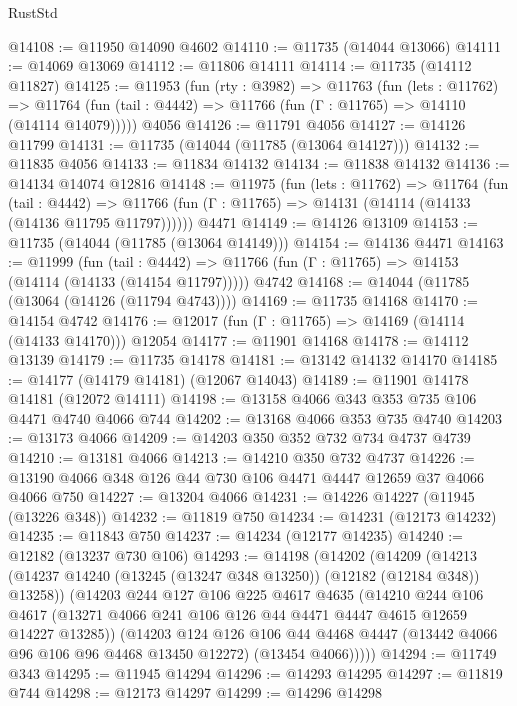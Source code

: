 \begin{lexlean}{RustStd}
\begin{coremodule}
@14108 := @11950 @14090 @4602
@14110 := @11735 (@14044 @13066)
@14111 := @14069 @13069
@14112 := @11806 @14111
@14114 := @11735 (@14112 @11827)
@14125 := @11953
    (fun (rty : @3982) =>
    @11763
      (fun (lets : @11762) =>
      @11764 (fun (tail : @4442) => @11766 (fun (Γ : @11765) => @14110 (@14114 @14079)))))
    @4056
@14126 := @11791 @4056
@14127 := @14126 @11799
@14131 := @11735 (@14044 (@11785 (@13064 @14127)))
@14132 := @11835 @4056
@14133 := @11834 @14132
@14134 := @11838 @14132
@14136 := @14134 @14074 @12816
@14148 := @11975
    (fun (lets : @11762) =>
    @11764
      (fun (tail : @4442) =>
      @11766 (fun (Γ : @11765) => @14131 (@14114 (@14133 (@14136 @11795 @11797))))))
    @4471
@14149 := @14126 @13109
@14153 := @11735 (@14044 (@11785 (@13064 @14149)))
@14154 := @14136 @4471
@14163 := @11999
    (fun (tail : @4442) => @11766 (fun (Γ : @11765) => @14153 (@14114 (@14133 (@14154 @11797)))))
    @4742
@14168 := @14044 (@11785 (@13064 (@14126 (@11794 @4743))))
@14169 := @11735 @14168
@14170 := @14154 @4742
@14176 := @12017 (fun (Γ : @11765) => @14169 (@14114 (@14133 @14170))) @12054
@14177 := @11901 @14168
@14178 := @14112 @13139
@14179 := @11735 @14178
@14181 := @13142 @14132 @14170
@14185 := @14177 (@14179 @14181) (@12067 @14043)
@14189 := @11901 @14178 @14181 (@12072 @14111)
@14198 := @13158 @4066 @343 @353 @735 @106 @4471 @4740 @4066 @744
@14202 := @13168 @4066 @353 @735 @4740
@14203 := @13173 @4066
@14209 := @14203 @350 @352 @732 @734 @4737 @4739
@14210 := @13181 @4066
@14213 := @14210 @350 @732 @4737
@14226 := @13190 @4066 @348 @126 @44 @730 @106 @4471 @4447 @12659 @37 @4066 @4066 @750
@14227 := @13204 @4066
@14231 := @14226 @14227 (@11945 (@13226 @348))
@14232 := @11819 @750
@14234 := @14231 (@12173 @14232)
@14235 := @11843 @750
@14237 := @14234 (@12177 @14235)
@14240 := @12182 (@13237 @730 @106)
@14293 := @14198
    (@14202
      (@14209
        (@14213 (@14237 @14240 (@13245 (@13247 @348 @13250)) (@12182 (@12184 @348)) @13258))
        (@14203
          @244
          @127
          @106
          @225
          @4617
          @4635
          (@14210
            @244
            @106
            @4617
            (@13271 @4066 @241 @106 @126 @44 @4471 @4447 @4615 @12659 @14227 @13285))
          (@14203
            @124
            @126
            @106
            @44
            @4468
            @4447
            (@13442 @4066 @96 @106 @96 @4468 @13450 @12272)
            (@13454 @4066)))))
@14294 := @11749 @343
@14295 := @11945 @14294
@14296 := @14293 @14295
@14297 := @11819 @744
@14298 := @12173 @14297
@14299 := @14296 @14298

\end{coremodule}
\end{lexlean}
